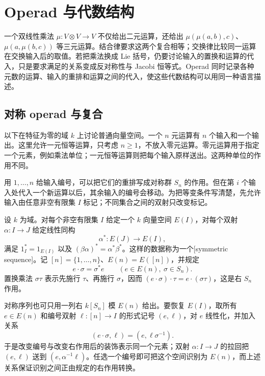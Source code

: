 
\section{Operad 与代数结构}
\label{b4:sec:G01}

一个双线性乘法 \(\mu:V\otimes V\rightarrow V\) 不仅给出二元运算，还给出 \(\mu(\mu(a,b),c)\)、\(\mu(a,\mu(b,c))\) 等三元运算。结合律要求这两个复合相等；交换律比较同一运算在交换输入后的取值。若把乘法换成 Lie 括号，仍要讨论输入的置换和运算的代入，只是要求满足的关系变成反对称性与 Jacobi 恒等式。Operad 同时记录各种元数的运算、输入的重排和运算之间的代入，使这些代数结构可以用同一种语言描述。

\subsection{对称 operad 与复合}
\label{b4:subsec:G01:01}

以下在特征为零的域 \(k\) 上讨论普通向量空间。一个 \(n\) 元运算有 \(n\) 个输入和一个输出。这里允许一元恒等运算，只考虑 \(n\geq1\)，不放入零元运算。零元运算用于指定一个元素，例如乘法单位；一元恒等运算则把每个输入原样送出。这两种单位的作用不同。

\ProseParagraphBreak
用 \(1,\ldots,n\) 给输入编号，可以把它们的重排写成对称群 \(S_n\) 的作用。但在第 \(i\) 个输入处代入一个新运算以后，其余输入的编号会移动。为把等变条件写清楚，先允许输入由任意非空有限集 \(I\) 标记；不同集合之间的双射只改变标记。

\begin{definition}\label{b4:def:symmetric-sequence-operad}
	设 \(k\) 为域。对每个非空有限集 \(I\) 给定一个 \(k\) 向量空间 \(E(I)\)，对每个双射 \(\alpha:I\rightarrow J\) 给定线性同构
	\[
		\alpha^*:E(J)\longrightarrow E(I),
	\]
	满足 \(1_I^*=1_{E(I)}\) 以及 \((\beta\alpha)^*=\alpha^*\beta^*\)。这样的数据称为一个[symmetric sequence]。记 \([n]=\{1,\ldots,n\}\)、\(E(n)=E([n])\)，并规定
	\[
		e\cdot\sigma=\sigma^*e\qquad(e\in E(n),\ \sigma\in S_n).
	\]
	置换乘法 \(\sigma\tau\) 表示先施行 \(\tau\)、再施行 \(\sigma\)，因而 \((e\cdot\sigma)\cdot\tau=e\cdot(\sigma\tau)\)，这是右 \(S_n\) 作用。
\end{definition}

对称序列也可只用一列右 \(k[S_n]\) 模 \(E(n)\) 给出。要恢复 \(E(I)\)，取所有 \(e\in E(n)\) 和编号双射 \(\ell:[n]\rightarrow I\) 的形式记号 \((e,\ell)\)，对 \(e\) 线性化，并加入关系
\[
	(e\cdot\sigma,\ell)=(e,\ell\sigma^{-1}).
\]
于是改变编号与改变右作用后的装饰表示同一个元素；双射 \(\alpha:I\rightarrow J\) 的拉回把 \((e,\ell)\) 送到 \((e,\alpha^{-1}\ell)\)。任选一个编号即可把这个空间识别为 \(E(n)\)，而上述关系保证识别之间正由规定的右作用转换。

